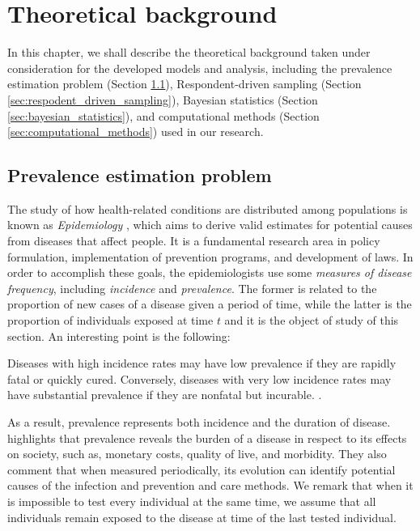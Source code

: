 \chapter{Theoretical background}
\label{ch:theoretical-background}

In this chapter, we shall describe the theoretical background
taken under consideration for the developed models and analysis, including
the prevalence estimation problem (Section
\ref{sec:prevalence_estimation_problem}), Respondent-driven sampling (Section
\ref{sec:respodent_driven_sampling}), Bayesian statistics (Section
\ref{sec:bayesian_statistics}), and computational methods (Section
\ref{sec:computational_methods}) used in our research.

\section{Prevalence estimation problem}
\label{sec:prevalence_estimation_problem}

The study of how health-related conditions are distributed among populations
is known as {\em Epidemiology} \cite[p. 32]{rothman2008modern}, which aims to derive valid estimates for
potential causes from diseases that affect people. It is a fundamental
research area in policy formulation, implementation of prevention programs,
and development of laws. In order to accomplish these goals, the
epidemiologists use some {\em measures of disease frequency}, including {\em
incidence} and {\em prevalence}. The former is related to the proportion of
new cases of a disease given a period of time, while the latter is the proportion
of individuals exposed at time $t$ and it is the object of
study of this section. An interesting point is the following:

\begin{citacao}
  Diseases with high incidence rates may have low prevalence if they are rapidly fatal or quickly cured. Conversely, diseases with very low incidence
  rates may have substantial prevalence if they are nonfatal but incurable.
  \cite[p. 46]{rothman2008modern}.
\end{citacao}

As a result, prevalence represents both incidence and the duration of disease. \textcite[p. c18]{noordzij2010measures} highlights that
prevalence reveals the burden of a disease in respect to its effects on
society, such as, monetary costs, quality of live, and morbidity. They also
comment that when measured periodically, its evolution can identify potential
causes of the infection and prevention and care methods. We remark that when it is impossible to test every individual at the same
time, we assume that all individuals remain exposed to the disease at time of
the last tested individual.

